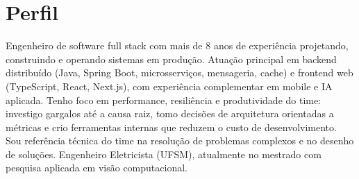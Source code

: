 \newcommand{\AND}{\unskip
\cleaders\copy\ANDbox\hskip\wd\ANDbox
\ignorespaces
}
\newsavebox\ANDbox
\sbox\ANDbox{$|$}


\vspace{5 pt - 0.3 cm}


\section{Perfil}

\begin{onecolentry}
    Engenheiro de software full stack com mais de 8 anos de experiência projetando, construindo e operando sistemas em produção. Atuação principal em backend distribuído (Java, Spring Boot, microsserviços, mensageria, cache) e frontend web (TypeScript, React, Next.js), com experiência complementar em mobile e IA aplicada. Tenho foco em performance, resiliência e produtividade do time: investigo gargalos até a causa raiz, tomo decisões de arquitetura orientadas a métricas e crio ferramentas internas que reduzem o custo de desenvolvimento. Sou referência técnica do time na resolução de problemas complexos e no desenho de soluções. Engenheiro Eletricista (UFSM), atualmente no mestrado com pesquisa aplicada em visão computacional.
\end{onecolentry}




